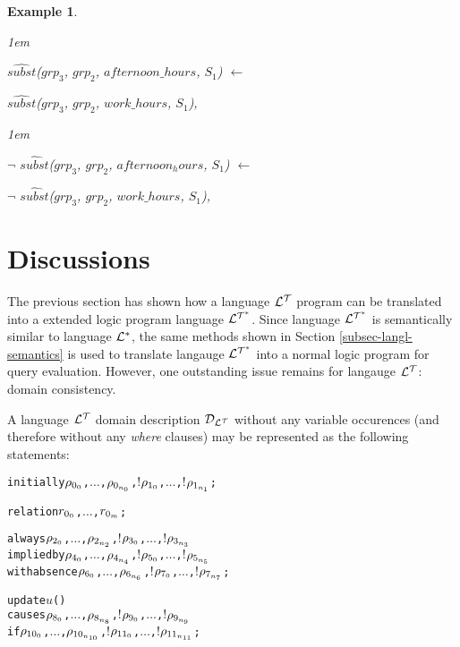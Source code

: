 \documentclass[11pt]{report}
\newtheorem{vexample}{Example}[chapter]
\newenvironment{vverbatim}
{
  \begin{alltt}
}
{
    \vspace{-\baselineskip}
  \end{alltt}
}
\newenvironment{vquote}
{
  \begin{list}{}{\leftmargin 1em}\item[]
}
{
  \end{list}
}
\begin{document}
\begin{vexample}
\begin{enumerate}
              \begin{vquote}
                $\hat{subst}$($grp_3$, $grp_2$, $afternoon\_hours$, $S_1$) $\leftarrow$

                \hspace{1em}
                $\hat{subst}$($grp_3$, $grp_2$, $work\_hours$, $S_1$),
              \end{vquote}

              \begin{vquote}
                $\lnot$ $\hat{subst}$($grp_3$, $grp_2$, $afternoon_hours$, $S_1$) $\leftarrow$

                \hspace{1em}
                $\lnot$ $\hat{subst}$($grp_3$, $grp_2$, $work\_hours$, $S_1$),
              \end{vquote}
          \end{enumerate}
        \end{vexample}

    \section{Discussions}

      The previous section has shown how a language ${\cal L^T}$ program can
      be translated into a extended logic program language ${\cal L^{T^*}}$.
      Since language ${\cal L^{T^*}}$ is semantically similar to language
      ${\cal L^*}$, the same methods shown in Section
      \ref{subsec-langl-semantics} is used to translate langauge
      ${\cal L^{T^*}}$ into a normal logic program for query evaluation.
      However, one outstanding issue remains for langauge ${\cal L^T}$: domain
      consistency.
      
      A language ${\cal L^T}$ domain description ${\cal D}_{\cal L^T}$ without
      any variable occurences (and therefore without any {\em where} clauses)
      may be represented as the following statements:

      \begin{vverbatim}
  initially \(\rho\sb{0\sb{0}}\), \(\ldots\), \(\rho\sb{0\sb{n\sb{0}}}\), \(!\)\(\rho\sb{1\sb{0}}\), \(\ldots\), \(!\)\(\rho\sb{1\sb{n\sb{1}}}\);

  relation \(r\sb{0\sb{0}}\), \(\ldots\), \(r\sb{0\sb{m}}\);

  always \(\rho\sb{2\sb{0}}\), \(\ldots\), \(\rho\sb{2\sb{n\sb{2}}}\), \(!\)\(\rho\sb{3\sb{0}}\), \(\ldots\), \(!\)\(\rho\sb{3\sb{n\sb{3}}}\)
    implied by \(\rho\sb{4\sb{0}}\), \(\ldots\), \(\rho\sb{4\sb{n\sb{4}}}\), \(!\)\(\rho\sb{5\sb{0}}\), \(\ldots\), \(!\)\(\rho\sb{5\sb{n\sb{5}}}\)
    with absence \(\rho\sb{6\sb{0}}\), \(\ldots\), \(\rho\sb{6\sb{n\sb{6}}}\), \(!\)\(\rho\sb{7\sb{0}}\), \(\ldots\), \(!\)\(\rho\sb{7\sb{n\sb{7}}}\);

  update \(u\)()
    causes \(\rho\sb{8\sb{0}}\), \(\ldots\), \(\rho\sb{8\sb{n\sb{8}}}\), \(!\)\(\rho\sb{9\sb{0}}\), \(\ldots\), \(!\)\(\rho\sb{9\sb{n\sb{9}}}\) 
    if \(\rho\sb{10\sb{0}}\), \(\ldots\), \(\rho\sb{10\sb{n\sb{10}}}\), \(!\)\(\rho\sb{11\sb{0}}\), \(\ldots\), \(!\)\(\rho\sb{11\sb{n\sb{11}}}\);
      \end{vverbatim}
\end{document}
